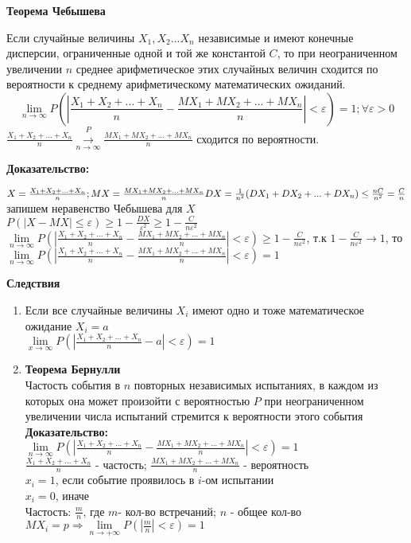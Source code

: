\begin{center}
    \textbf{Теорема Чебышева}
\end{center} 

Если случайные величины $X_1,X_2 ... X_n$ независимые и имеют конечные дисперсии, ограниченные одной и той же константой $C$, то при неограниченном увеличении $n$ среднее арифметическое этих случайных величин сходится по вероятности 
к среднему арифметическому математических ожиданий.
$$\lim \limits_{n \to \infty} {P(|\frac{X_1+X_2+ ... +X_n}{n} - \frac{MX_1+MX_2+ ...+MX_n}{n}| < \varepsilon)=1}; \forall \varepsilon > 0$$
$ \frac{X_1+X_2+ ... +X_n}{n} \stackrel{P}{\xrightarrow[n\to\infty]{}} \frac{MX_1+MX_2+ ...+MX_n}{n} $ сходится по вероятности.

\textbf{Доказательство: }

$X=\frac{X_1+X_2+ ... +X_n}{n}; MX=\frac{MX_1+MX_2+ ... +MX_n}{n} \\
DX=\frac{1}{n^2}(DX_1+DX_2+ ... +DX_n) \le \frac{nC}{n^2} = \frac{C}{n}$ \\
запишем неравенство Чебышева для $X$ \\
$P(|X-MX| \le \varepsilon) \ge 1 - \frac{DX}{\varepsilon^2} \ge 1 - \frac{C}{n \varepsilon^2}$ \\
$\lim \limits_{n \to \infty} {P(|\frac{X_1+X_2+ ... +X_n}{n} - \frac{MX_1+MX_2+ ...+MX_n}{n}| < \varepsilon) \ge 1-\frac{C}{n \varepsilon^2}}$, т.к $1-\frac{C}{n \varepsilon^2} \to 1$, то \\
$\lim \limits_{n \to \infty} {P(|\frac{X_1+X_2+ ... +X_n}{n} - \frac{MX_1+MX_2+ ...+MX_n}{n}| < \varepsilon)=1}$

\textbf {Следствия}

\begin{enumerate}
  \item Если все случайные величины $X_i$ имеют одно и тоже математическое ожидание $X_i=a$ \\ 
    $\lim \limits_{x \to \infty} {P(|\frac{X_1+X_2+ ... +X_n}{n} - a| < \varepsilon)=1}$
  \item \textbf {Теорема Бернулли} \\
    Частость события в $n$ повторных независимых испытаниях, в каждом из которых она может произойти с вероятностью $P$ при неограниченном увеличении числа
    испытаний стремится к вероятности этого события\\
    \textbf{Доказательство: }\\
    $\lim \limits_{n \to \infty} {P(|\frac{X_1+X_2+ ... +X_n}{n} - \frac{MX_1+MX_2+ ...+MX_n}{n}| < \varepsilon)=1}$ \\
    $\frac{X_1+X_2+ ... +X_n}{n}$ - частость; $\frac{MX_1+MX_2+ ...+MX_n}{n}$ - вероятность \\
    $x_i=1$, если событие проявилось в $i$-ом испытании \\
    $x_i=0$, иначе \\
    Частость: $\frac{m}{n}$, где $m$- кол-во встречаний; $n$ - общее кол-во \\
    $MX_i=p \Rightarrow \lim \limits_{n \to +\infty}{P(|\frac{m}{n}|<\varepsilon)}=1 $
\end{enumerate}

